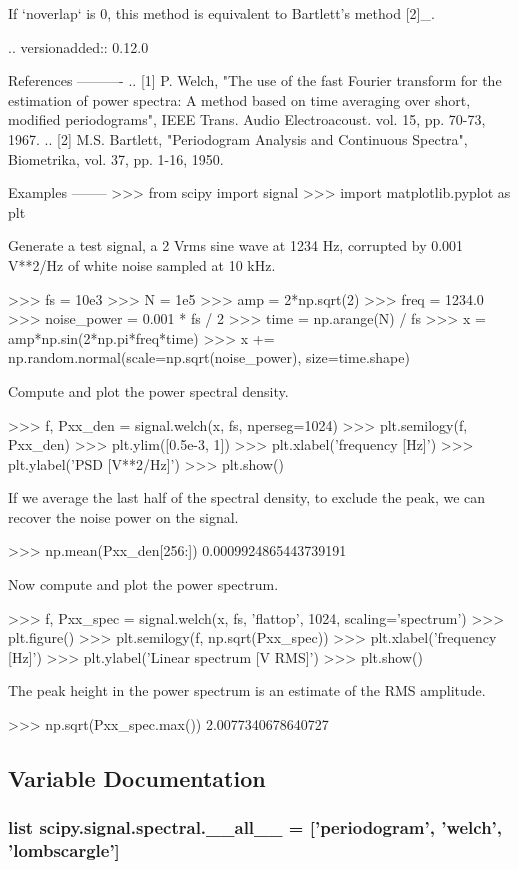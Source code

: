 \begin{DoxyVerb}
If `noverlap` is 0, this method is equivalent to Bartlett's method [2]_.

.. versionadded:: 0.12.0

References
----------
.. [1] P. Welch, "The use of the fast Fourier transform for the
       estimation of power spectra: A method based on time averaging
       over short, modified periodograms", IEEE Trans. Audio
       Electroacoust. vol. 15, pp. 70-73, 1967.
.. [2] M.S. Bartlett, "Periodogram Analysis and Continuous Spectra",
       Biometrika, vol. 37, pp. 1-16, 1950.

Examples
--------
>>> from scipy import signal
>>> import matplotlib.pyplot as plt

Generate a test signal, a 2 Vrms sine wave at 1234 Hz, corrupted by
0.001 V**2/Hz of white noise sampled at 10 kHz.

>>> fs = 10e3
>>> N = 1e5
>>> amp = 2*np.sqrt(2)
>>> freq = 1234.0
>>> noise_power = 0.001 * fs / 2
>>> time = np.arange(N) / fs
>>> x = amp*np.sin(2*np.pi*freq*time)
>>> x += np.random.normal(scale=np.sqrt(noise_power), size=time.shape)

Compute and plot the power spectral density.

>>> f, Pxx_den = signal.welch(x, fs, nperseg=1024)
>>> plt.semilogy(f, Pxx_den)
>>> plt.ylim([0.5e-3, 1])
>>> plt.xlabel('frequency [Hz]')
>>> plt.ylabel('PSD [V**2/Hz]')
>>> plt.show()

If we average the last half of the spectral density, to exclude the
peak, we can recover the noise power on the signal.

>>> np.mean(Pxx_den[256:])
0.0009924865443739191

Now compute and plot the power spectrum.

>>> f, Pxx_spec = signal.welch(x, fs, 'flattop', 1024, scaling='spectrum')
>>> plt.figure()
>>> plt.semilogy(f, np.sqrt(Pxx_spec))
>>> plt.xlabel('frequency [Hz]')
>>> plt.ylabel('Linear spectrum [V RMS]')
>>> plt.show()

The peak height in the power spectrum is an estimate of the RMS amplitude.

>>> np.sqrt(Pxx_spec.max())
2.0077340678640727\end{DoxyVerb}
 

\subsection{Variable Documentation}
\hypertarget{namespacescipy_1_1signal_1_1spectral_ab99b4dee92b82cefec0541361ba8fd3b}{}
\subsubsection[{\+\_\+\+\_\+all\+\_\+\+\_\+}]{\setlength{\rightskip}{0pt plus 5cm}list scipy.\+signal.\+spectral.\+\_\+\+\_\+all\+\_\+\+\_\+ = \mbox{[}'{\bf periodogram}', '{\bf welch}', 'lombscargle'\mbox{]}}\label{namespacescipy_1_1signal_1_1spectral_ab99b4dee92b82cefec0541361ba8fd3b}
